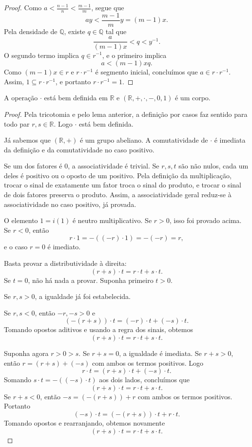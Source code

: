 \begin{proof}
    Como $a<\frac{n-1}{n}<\frac{m-1}{m}$, segue que
    \[
        ay<\frac{m-1}{m}y=(m-1)x.
    \]
    Pela densidade de $\mathbb Q$, existe $q\in\mathbb Q$ tal que
    \[
        \frac{a}{(m-1)x}<q<y^{-1}.
    \]
    O segundo termo implica $q\in r^{-1}$, e o primeiro implica
    \[
        a<(m-1)xq.
    \]
    Como $(m-1)x\in r$ e $r\cdot r^{-1}$ é segmento inicial, concluímos que $a\in r\cdot r^{-1}$.
    Assim, $1\subseteq r\cdot r^{-1}$, e portanto $r\cdot r^{-1}=1$.
\end{proof}

\begin{proposition}
    A operação $\cdot$ está bem definida em $\mathbb R$ e $(\mathbb R,+,\cdot,-,0,1)$ é um corpo.
\end{proposition}
\begin{proof}
    Pela tricotomia e pelo lema anterior, a definição por casos faz sentido para todo par $r, s\in\mathbb R$.
    Logo $\cdot$ está bem definida.

    Já sabemos que $(\mathbb R,+)$ é um grupo abeliano.
    A comutatividade de $\cdot$ é imediata da definição e da comutatividade no caso positivo.

    Se um dos fatores é $0$, a associatividade é trivial.
    Se $r, s, t$ são não nulos, cada um deles é positivo ou o oposto de um positivo.
    Pela definição da multiplicação, trocar o sinal de exatamente um fator troca o sinal do produto, e trocar o sinal de dois fatores preserva o produto.
    Assim, a associatividade geral reduz-se à associatividade no caso positivo, já provada.

    O elemento $1=i(1)$ é neutro multiplicativo.
    Se $r>0$, isso foi provado acima.
    Se $r<0$, então
    \[
        r\cdot 1=-((-r)\cdot 1)=-(-r)=r,
    \]
    e o caso $r=0$ é imediato.

    Basta provar a distributividade à direita:
    \[
        (r+s)\cdot t=r\cdot t+s\cdot t.
    \]
    Se $t=0$, não há nada a provar.
    Suponha primeiro $t>0$.

    Se $r,s>0$, a igualdade já foi estabelecida.

    Se $r,s<0$, então $-r,-s>0$ e
    \[
        (-(r+s))\cdot t=(-r)\cdot t+(-s)\cdot t.
    \]
    Tomando opostos aditivos e usando a regra dos sinais, obtemos
    \[
        (r+s)\cdot t=r\cdot t+s\cdot t.
    \]

    Suponha agora $r>0>s$.
    Se $r+s=0$, a igualdade é imediata.
    Se $r+s>0$, então $r=(r+s)+(-s)$ com ambos os termos positivos.
    Logo
    \[
        r\cdot t=(r+s)\cdot t+(-s)\cdot t.
    \]
    Somando $s\cdot t=-((-s)\cdot t)$ aos dois lados, concluímos que
    \[
        (r+s)\cdot t=r\cdot t+s\cdot t.
    \]
    Se $r+s<0$, então $-s=(-(r+s))+r$ com ambos os termos positivos.
    Portanto
    \[
        (-s)\cdot t=(-(r+s))\cdot t+r\cdot t.
    \]
    Tomando opostos e rearranjando, obtemos novamente
    \[
        (r+s)\cdot t=r\cdot t+s\cdot t.
    \]


\end{proof}
